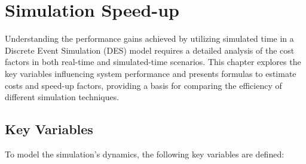 \chapter{Simulation Speed-up}

Understanding the performance gains achieved by utilizing simulated time in a Discrete Event Simulation (DES) model requires a detailed analysis of the cost factors in both real-time and simulated-time scenarios. This chapter explores the key variables influencing system performance and presents formulas to estimate costs and speed-up factors, providing a basis for comparing the efficiency of different simulation techniques.

\section{Key Variables}

To model the simulation's dynamics, the following key variables are defined:

